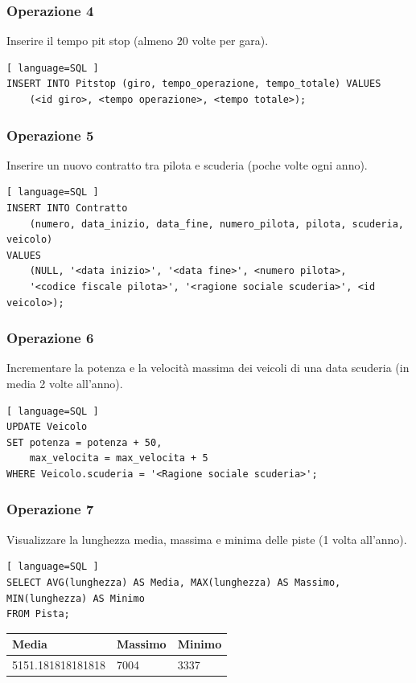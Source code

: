 \documentclass[11pt]{article}
\begin{document}
\subsubsection{Operazione 4}
Inserire il tempo pit stop (almeno 20 volte per gara).
\begin{lstlisting}[ language=SQL ]
INSERT INTO Pitstop (giro, tempo_operazione, tempo_totale) VALUES 
    (<id giro>, <tempo operazione>, <tempo totale>);
\end{lstlisting}


\subsubsection{Operazione 5}
Inserire un nuovo contratto tra pilota e scuderia (poche volte ogni anno).
\begin{lstlisting}[ language=SQL ]
INSERT INTO Contratto 
    (numero, data_inizio, data_fine, numero_pilota, pilota, scuderia, veicolo) 
VALUES 
    (NULL, '<data inizio>', '<data fine>', <numero pilota>, 
    '<codice fiscale pilota>', '<ragione sociale scuderia>', <id veicolo>);
\end{lstlisting}


\subsubsection{Operazione 6}
Incrementare la potenza e la velocità massima dei veicoli di una data scuderia (in media 2 volte all'anno).
\begin{lstlisting}[ language=SQL ]
UPDATE Veicolo
SET potenza = potenza + 50,
    max_velocita = max_velocita + 5
WHERE Veicolo.scuderia = '<Ragione sociale scuderia>';   
\end{lstlisting}


\subsubsection{Operazione 7}
Visualizzare la lunghezza media, massima e minima delle piste (1 volta all'anno).
\begin{lstlisting}[ language=SQL ]
SELECT AVG(lunghezza) AS Media, MAX(lunghezza) AS Massimo, MIN(lunghezza) AS Minimo
FROM Pista;
\end{lstlisting}

\begin{table}[!ht]
    \centering
    \begin{tabular}{|l|l|l|}
    \hline
        \textbf{Media} & \textbf{Massimo} & \textbf{Minimo} \\ \hline
        5151.181818181818 & 7004 & 3337 \\ \hline
    \end{tabular}
\end{table}
\end{document}
